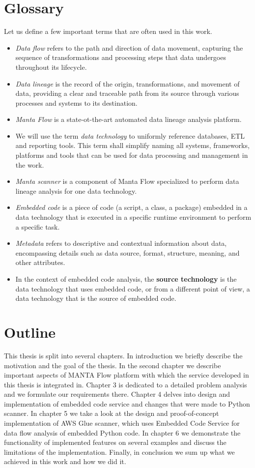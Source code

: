 \section{Glossary}

Let us define a few important terms that are often used in this work.
\begin{itemize}
    \item \textit{Data flow} refers to the path and direction of data movement, capturing the sequence of transformations and processing steps that data undergoes throughout its lifecycle.
    \item \textit{Data lineage} is the record of the origin, transformations, and movement of data, providing a clear and traceable path from its source through various processes and systems to its destination.
    \item \textit{Manta Flow} is a state-ot-the-art automated data lineage analysis platform.
    \item We will use the term \textit{data technology} to uniformly reference databases, ETL and reporting tools. This term shall simplify naming all systems, frameworks, platforms and tools that can be used for data processing and management in the work.    
    \item \textit{Manta scanner} is a component of Manta Flow specialized to perform data lineage analysis for one data technology.
    \item \textit{Embedded code} is a piece of code (a script, a class, a package) embedded in a data technology that is executed in a specific runtime environment to perform a specific task.
    \item \textit{Metadata} refers to descriptive and contextual information about data, encompassing details such as data source, format, structure, meaning, and other attributes.
    \item In the context of embedded code analysis, the \textbf{source technology} is the data technology that uses embedded code, or from a different point of view, a data technology that is the source of embedded code.
\end{itemize}

\section{Outline}

This thesis is split into several chapters. In introduction we briefly describe the motivation and the goal of the thesis. In the second chapter we describe important aspects of MANTA Flow platform with which the service developed in this thesis is integrated in. Chapter 3 is dedicated to a detailed problem analysis and we formulate our requirements there. Chapter 4 delves into design and implementation of embedded code service and changes that were made to Python scanner. In chapter 5 we take a look at the design and proof-of-concept implementation of AWS Glue scanner, which uses Embedded Code Service for data flow analysis of embedded Python code. In chapter 6 we demonstrate the functionality of implemented features on several examples and discuss the limitations of the implementation. Finally, in conclusion we sum up what we achieved in this work and how we did it.